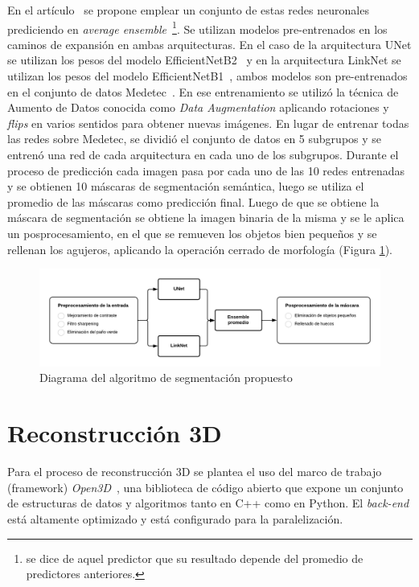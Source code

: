 {En el artículo~\cite{mahbod2021automatic} se propone emplear un conjunto de estas redes neuronales prediciendo en \textit{average ensemble}~\footnote{se dice de aquel predictor que su resultado depende del promedio de predictores anteriores.}. Se utilizan modelos pre-entrenados en los caminos de expansión en ambas arquitecturas. En el caso de la arquitectura UNet se utilizan los pesos del modelo EfficientNetB2~\cite{tan2019efficientnet} y en la arquitectura LinkNet se utilizan los pesos del modelo EfficientNetB1~\cite{tan2019efficientnet}, ambos modelos son pre-entrenados en el conjunto de datos Medetec~\cite{medetec}. En ese entrenamiento se utilizó la técnica de Aumento de Datos conocida como \textit{Data Augmentation} aplicando rotaciones y \textit{flips} en varios sentidos para obtener nuevas imágenes. En lugar de entrenar todas las redes sobre Medetec, se dividió el conjunto de datos en 5 subgrupos y se entrenó una red de cada arquitectura en cada uno de los subgrupos. Durante el proceso de predicción cada imagen pasa por cada uno de las 10 redes entrenadas y se obtienen 10 máscaras de segmentación semántica, luego se utiliza el promedio de las máscaras como predicción final. Luego de que se obtiene la máscara de segmentación se obtiene la imagen binaria de la misma y se le aplica un posprocesamiento, en el que se remueven los objetos bien pequeños y se rellenan los agujeros, aplicando la operación cerrado de morfología (Figura \ref{fig:pipeSeg}).

\begin{figure}[ht]
	\centering
	\includegraphics[width=12cm]{./Graphics/segmentation.png}
	\caption{Diagrama del algoritmo de segmentación propuesto}
	\label{fig:pipeSeg}
\end{figure}

\section{Reconstrucción 3D}

Para el proceso de reconstrucción 3D se plantea el uso del marco de trabajo (framework) \textit{Open3D}~\cite{zhou2018open3d}, una biblioteca de código abierto que expone un conjunto de estructuras de datos y algoritmos tanto en C++ como en Python. El \textit{back-end} está altamente optimizado y está configurado para la paralelización.

}
